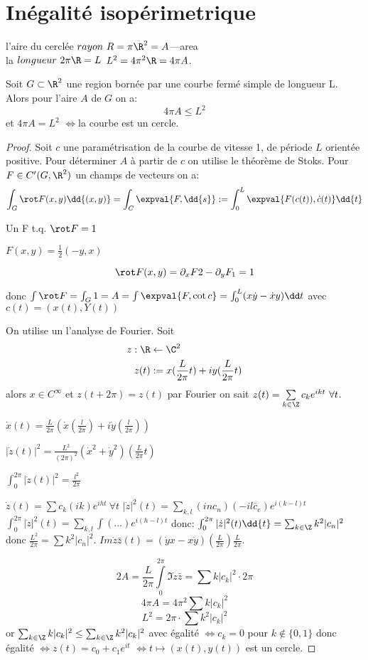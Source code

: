 				\section{Inégalité isopérimetrique} %

				l'aire du cerclée  $rayon\ R=\pi\R^2=A$---area\\
				la $longueur\ 2\pi\R=L$
				$L^2=4\pi^2\R=4\pi A$.
				\begin{theorem}
					Soit $G\subset\R^2$ une region bornée par une courbe fermé simple de longueur L. Alors pour l'aire $A$ de $G$ on a:
					$$4\pi A\leq L^2$$
					et $4\pi A=L^2$ $\Leftrightarrow$la courbe est un cercle.
				\end{theorem}
				\begin{proof}
					Soit $c$ une paramétrisation de la courbe de vitesse 1, de période $L$ orientée positive. Pour déterminer $A$ à partir de $c$ on utilise le théorème de Stoks. Pour $F\in C'(G,\R^2)$ un champs de vecteurs on a:
					$$\int_G \rot F(x,y)\dd{(x,y)}=\int_C \expval{F,\dd{s}}:=\int_0^L \expval{F(c(t)),\dot c(t)}\dd{t}$$
		
					Un F t.q. $\rot F=1$
		
					$F(x,y)=\frac 12 (-y,x)$
		
					$$\rot F(x,y)=\partial_x F2 - \partial_y F_1 = 1$$
		
					donc $\int \rot F=\int_G 1=A=\int\expval{F, \cot c}=\int_0^L(x\dot y-\dot x y)\dd t$ avec $c(t)=(x(t),Y(t))$
		
					On utilise un l'analyse de Fourier. Soit 
					\begin{align*}			
						z:\R &\leftarrow  \C^2\\
						z(t) &:= x(\frac L{2\pi}t)+i y(\frac L{2\pi}t)
					\end{align*}
					alors $x\in C^\infty$ et $z(t+2\pi)=z(t)$ par Fourier on sait $z(t)=\sum\limits_{k\in\Z}c_ke^{ikt}\ \forall t$.
		
					$\dot x(t)=\frac L{2\pi}(\dot x(\frac l{2\pi})+i\dot y(\frac l{2\pi}))$
		
					$|\dot z(t)|^2=\frac{L^2}{(2\pi)^2}(\dot x^2+\dot y^2)(\frac L{2\pi}t)$
		
					$\int_0^{2\pi}|\dot z (t)|^2=\frac{l^2}{2\pi}$
		
					$\dot z(t)=\sum c_k(ik)e^{iht}\ \forall t$
					$|\dot z|^2(t)=\sum_{k,l}(inc_n)(-il\bar c_e)e^{i(k-l)t}$
					$\int_0^{2\pi}|\dot z|^2(t)=\sum_{k,l}\int(...)e^{i(h-l)t}$
					donc:
					$\int_0^{2\pi}|\dot z|^2(t)\dd{t}=\sum_{k\in\Z}k^2|c_n|^2$ donc $\frac{L^2}{2\pi}=\sum k^2|c_n|^2$.
					$Im\dot z\bar z(t)=(\dot yx-x\dot y)(\frac L{2\pi})\frac L{2\pi}$.
		
					$$2A=\frac L{2\pi}\int\limits_0^{2\pi}\Im \dot z\bar z=\sum k|c_k|^2\cdot 2\pi$$
					$$4\pi A=4\pi^2\sum k|c_k|^2$$
					$$L^2=2\pi\cdot \sum k^2 |c_k|^2$$
					or $\sum_{k\in\Z}k|c_k|^2\leq\sum_{k\in\Z}k^2|c_k|^2$ avec égalité $\Leftrightarrow$$c_k=0$ pour $k\not\in\{0,1\}$ donc égalité $\Leftrightarrow$$z(t)=c_0+c_1e^{it}$ $\Leftrightarrow$$t\mapsto (x(t),y(t))$ est un cercle.
		
				\end{proof}
				
